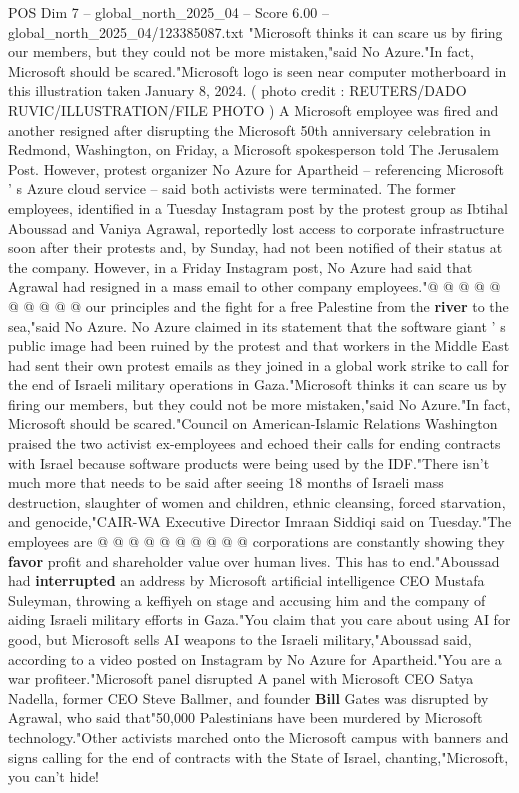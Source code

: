 \begin{textsample}{POS Dim 7 – global\_north\_2025\_04 – Score 6.00 – global\_north\_2025\_04/123385087.txt}  \label{ex:f7_pos_363}
"Microsoft thinks it can scare us by firing our members, but they could not be more mistaken,"said No Azure."In fact, Microsoft should be scared."Microsoft logo is seen near computer motherboard in this illustration taken January 8, 2024. ( photo credit : REUTERS/DADO RUVIC/ILLUSTRATION/FILE PHOTO ) A Microsoft employee was fired and another resigned after disrupting the Microsoft 50th anniversary celebration in Redmond, Washington, on Friday, a Microsoft spokesperson told The Jerusalem Post.
However, protest organizer No Azure for Apartheid -- referencing Microsoft ' s Azure cloud service -- said both activists were terminated.
The former employees, identified in a Tuesday Instagram post by the protest group as Ibtihal Aboussad and Vaniya Agrawal, reportedly lost access to corporate infrastructure soon after their protests and, by Sunday, had not been notified of their status at the company.
However, in a Friday Instagram post, No Azure had said that Agrawal had resigned in a mass email to other company employees."@ @ @ @ @ @ @ @ @ @ our principles and the fight for a free Palestine from the \textbf{river} to the sea,"said No Azure.
No Azure claimed in its statement that the software giant ' s public image had been ruined by the protest and that workers in the Middle East had sent their own protest emails as they joined in a global work strike to call for the end of Israeli military operations in Gaza."Microsoft thinks it can scare us by firing our members, but they could not be more mistaken,"said No Azure."In fact, Microsoft should be scared."Council on American-Islamic Relations Washington praised the two activist ex-employees and echoed their calls for ending contracts with Israel because software products were being used by the IDF."There isn't much more that needs to be said after seeing 18 months of Israeli mass destruction, slaughter of women and children, ethnic cleansing, forced starvation, and genocide,"CAIR-WA Executive Director Imraan Siddiqi said on Tuesday."The employees are @ @ @ @ @ @ @ @ @ @ corporations are constantly showing they \textbf{favor} profit and shareholder value over human lives.
This has to end."Aboussad had \textbf{interrupted} an address by Microsoft artificial intelligence CEO Mustafa Suleyman, throwing a keffiyeh on stage and accusing him and the company of aiding Israeli military efforts in Gaza."You claim that you care about using AI for good, but Microsoft sells AI weapons to the Israeli military,"Aboussad said, according to a video posted on Instagram by No Azure for Apartheid."You are a war profiteer."Microsoft panel disrupted A panel with Microsoft CEO Satya Nadella, former CEO Steve Ballmer, and founder \textbf{Bill} Gates was disrupted by Agrawal, who said that"50,000 Palestinians have been murdered by Microsoft technology."Other activists marched onto the Microsoft campus with banners and signs calling for the end of contracts with the State of Israel, chanting,"Microsoft, you can't hide!

\end{textsample}

